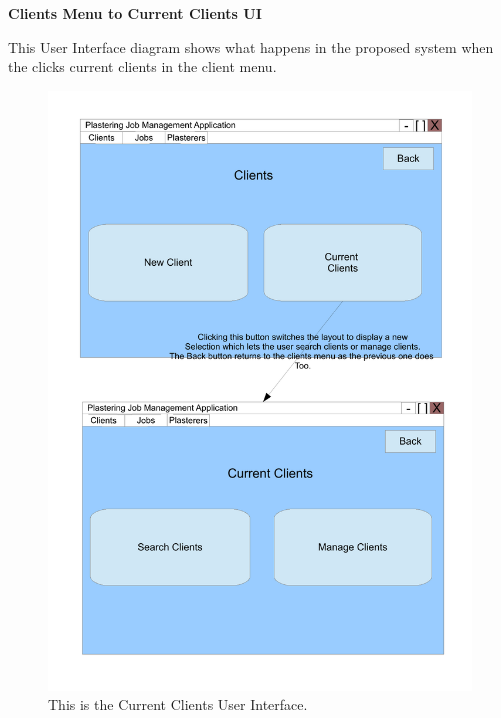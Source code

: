 \pagebreak
\textbf{Clients Menu to Current Clients UI}
\begin{flushleft}
This User Interface diagram shows what happens in the proposed system when the clicks current clients in the client menu.
\end{flushleft}
\begin{figure}[H]
\includegraphics[scale=0.5]{./Design/images/UI-CurrentClients.pdf}
    \caption{This is the Current Clients User Interface.} 
\label{fig:FlowChartNewClient}
\end{figure}

